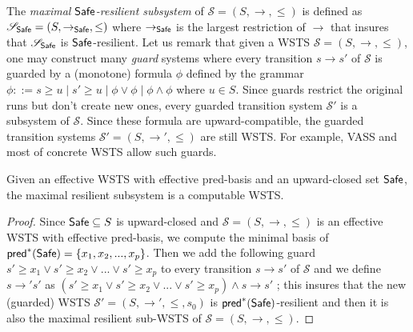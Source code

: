 The \emph{maximal $\textsf{Safe}$-resilient subsystem} of $\mathscr{S}=(S,\rightarrow,\leq)$ is defined as $\mathscr{S}_{\textsf{Safe}}=(S,\rightarrow_{\textsf{Safe}},\leq)$ where $\rightarrow_{\textsf{Safe}}$ is the largest restriction of $\rightarrow$ that insures that $\mathscr{S}_{\textsf{Safe}}$ is $\textsf{Safe}$-resilient.
Let us remark that given a WSTS $\mathscr{S}=(S, \rightarrow, \leq)$, one may construct many \emph{guard} systems where every transition $s \rightarrow s'$ of $\mathscr{S}$ is guarded by a (monotone) formula $\phi$ defined by the grammar $\phi ::= s \geq u \mid s' \geq u \mid \phi \vee \phi \mid \phi \wedge \phi$ where $u \in S$. Since guards restrict the original runs but don't create new ones, every guarded transition system $\mathscr{S'}$ is a subsystem of $\mathscr{S}$. Since these formula are upward-compatible, the guarded transition systems $\mathscr{S'}=(S, \rightarrow', \leq)$ are still WSTS.
%
For example, VASS and most of concrete WSTS allow such guards.

\begin{theorem}{}
Given an effective WSTS with effective pred-basis and an upward-closed set $\textsf{Safe}$, the maximal resilient subsystem is a computable WSTS.
\end{theorem}

\begin{proof}
Since $\textsf{Safe} \subseteq S$ is upward-closed and $\mathscr{S}=(S, \rightarrow, \leq)$ is an effective WSTS with effective pred-basis, we compute the minimal basis of $\textsf{pred}^*(\textsf{Safe})=\{x_1,x_2,...,x_p\}$. 
%
%
Then we add the following guard $s' \geq x_1  	\vee s' \geq x_2  	\vee...	\vee s' \geq x_p$ to every transition $s \rightarrow s'$ of $\mathscr{S}$ and we define  $s \rightarrow' s'$ as $(s' \geq x_1  	\vee s' \geq x_2  	\vee...	\vee s' \geq x_p) \wedge s \rightarrow s'$ ; this insures that the new (guarded) WSTS $\mathscr{S'}=(S, \rightarrow', \leq,s_0)$ is $\textsf{pred}^*(\textsf{Safe})$-resilient and then it is also the maximal resilient sub-WSTS of $\mathscr{S}=(S, \rightarrow, \leq)$.
		\end{proof}
%



